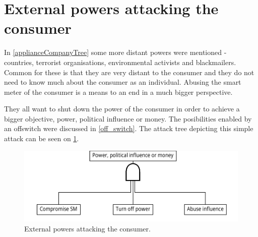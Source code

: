 
\section{External powers attacking the consumer}
In \cref{applianceCompanyTree} some more distant powers were mentioned - countries, terrorist organisations, environmental activists and blackmailers.
Common for these is that they are very distant to the consumer and they do not need to know much about the consumer as an individual.
Abusing the smart meter of the consumer is a means to an end in a much bigger perspective.

They all want to shut down the power of the consumer in order to achieve a bigger objective, power, political influence or money.
The posibilities enabled by an offswitch were discussed in \cref{off_switch}.
The attack tree depicting this simple attack can be seen on \cref{fig:attack_trees:external}.

\begin{figure}[h]
  \centering
	\includegraphics[width=.75\textwidth]{figures/graphviz/offswitch.pdf}
	\caption{External powers attacking the consumer.}
	\label{fig:attack_trees:external}
\end{figure}